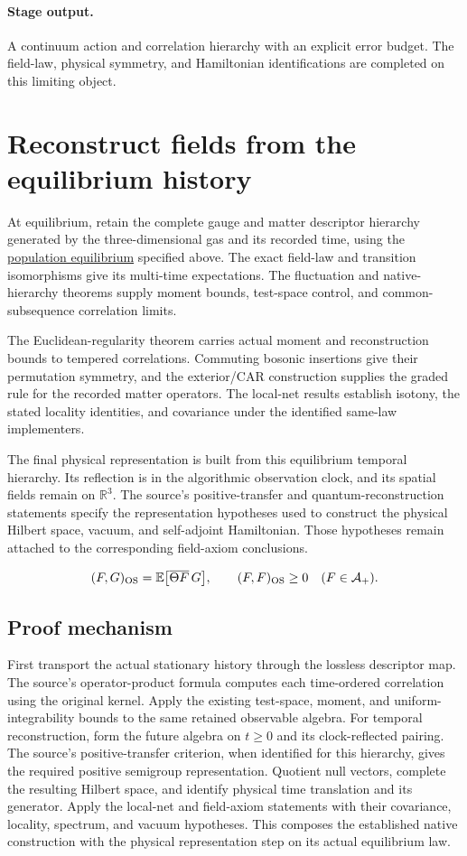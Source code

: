 \documentclass[11pt,a4paper]{article}
\begin{document}
\paragraph{Stage output.} A continuum action and correlation hierarchy with an explicit error budget. The field-law, physical symmetry, and Hamiltonian identifications are completed on this limiting object.

\section{Reconstruct fields from the equilibrium history}
\label{stage:17}
At equilibrium, retain the complete gauge and matter descriptor hierarchy generated by the three-dimensional gas and its recorded time, using the \hyperref[sec:equilibrium-thermodynamics]{population equilibrium} specified above. The exact field-law and transition isomorphisms give its multi-time expectations. The fluctuation and native-hierarchy theorems supply moment bounds, test-space control, and common-subsequence correlation limits.

The Euclidean-regularity theorem carries actual moment and reconstruction bounds to tempered correlations. Commuting bosonic insertions give their permutation symmetry, and the exterior/CAR construction supplies the graded rule for the recorded matter operators. The local-net results establish isotony, the stated locality identities, and covariance under the identified same-law implementers.

The final physical representation is built from this equilibrium temporal hierarchy. Its reflection is in the algorithmic observation clock, and its spatial fields remain on \(\mathbb R^3\). The source's positive-transfer and quantum-reconstruction statements specify the representation hypotheses used to construct the physical Hilbert space, vacuum, and self-adjoint Hamiltonian. Those hypotheses remain attached to the corresponding field-axiom conclusions.

\begin{gather*}
(F,G)_{\rm OS}=\mathbb E\bigl[\overline{\Theta F}\,G\bigr],\qquad
(F,F)_{\rm OS}\ge0\quad(F\in\mathcal A_+).
\end{gather*}
\subsection*{Proof mechanism}
First transport the actual stationary history through the lossless descriptor map. The source's operator-product formula computes each time-ordered correlation using the original kernel. Apply the existing test-space, moment, and uniform-integrability bounds to the same retained observable algebra. For temporal reconstruction, form the future algebra on \(t\ge0\) and its clock-reflected pairing. The source's positive-transfer criterion, when identified for this hierarchy, gives the required positive semigroup representation. Quotient null vectors, complete the resulting Hilbert space, and identify physical time translation and its generator. Apply the local-net and field-axiom statements with their covariance, locality, spectrum, and vacuum hypotheses. This composes the established native construction with the physical representation step on its actual equilibrium law.
\end{document}
